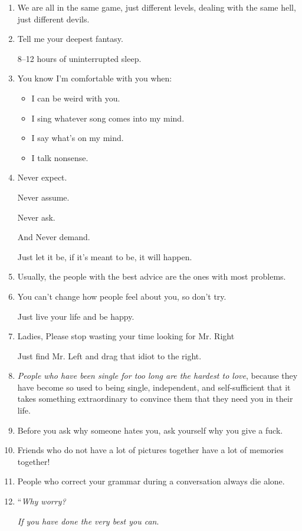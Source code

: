 \documentclass{article}
\numberwithin{equation}{section}
\begin{document}
\begin{enumerate}
    A weak man can always be found in a crowd.
    \item We are all in the same game, just different levels, dealing with the same hell, just different devils.
    \item Tell me your deepest fantasy.
    
    8--12 hours of uninterrupted sleep.
    \item You know I'm comfortable with you when:
    \begin{itemize}
        \item[1.] I can be weird with you.
        \item[2.] I sing whatever song comes into my mind.
        \item[3.] I say what's on my mind.
        \item[4.] I talk nonsense.
    \end{itemize}
    \item Never expect.
    
    Never assume.
    
    Never ask.
    
    And Never demand.
    
    Just let it be, if it's meant to be, it will happen.
    \item Usually, the people with the best advice are the ones with most problems.
    \item You can't change how people feel about you, so don't try.
    
    Just live your life and be happy.
    \item Ladies, Please stop wasting your time looking for Mr. Right
    
    Just find Mr. Left and drag that idiot to the right.
    \item \textit{People who have been single for too long are the hardest to love}, because they have become so used to being single, independent, and self-sufficient that it takes something extraordinary to convince them that they need you in their life.
    \item Before you ask why someone hates you, ask yourself why you give a fuck.
    \item Friends who do not have a lot of pictures together have a lot of memories together!
    \item People who correct your grammar during a conversation always die alone.
    \item ``\textit{Why worry?}
    
    \textit{If you have done the very best you can}.
    

\end{enumerate}
\end{document}
